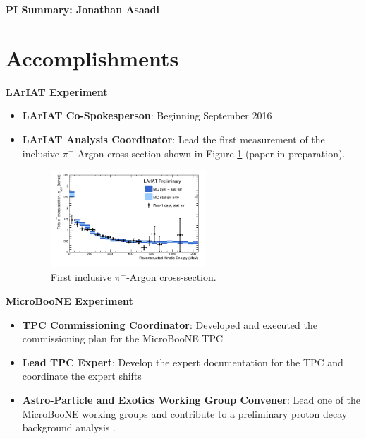 
\begin{center}
\LARGE\textbf{PI Summary: Jonathan Asaadi}
\end{center}

\section*{\textbf{Accomplishments}}

\noindent\textbf{LArIAT Experiment}

\begin{itemize}[noitemsep,nolistsep]
\item{\textbf{LArIAT Co-Spokesperson}}: Beginning September 2016

\item{\textbf{LArIAT Analysis Coordinator}}: Lead the first measurement of the inclusive $\pi^{-}$-Argon cross-section shown in Figure \ref{fig:LArIATCrossSection} (paper in preparation).

\begin{figure}[htb]
\centering
\includegraphics[width=0.55\textwidth]{images/LArIATCrossSection.png}
\caption[]{First inclusive $\pi^{-}$-Argon cross-section.}
\label{fig:LArIATCrossSection}
\end{figure}


\end{itemize}

\noindent\textbf{MicroBooNE Experiment}
\begin{itemize}[noitemsep,nolistsep]
\item{\textbf{TPC Commissioning Coordinator}}: Developed and executed the commissioning plan for the MicroBooNE TPC

\item{\textbf{Lead TPC Expert}}: Develop the expert documentation for the TPC and coordinate the expert shifts

\item{\textbf{Astro-Particle and Exotics Working Group Convener}}: Lead one of the MicroBooNE working groups and contribute to a preliminary proton decay background analysis \cite{}.

\end{itemize}

